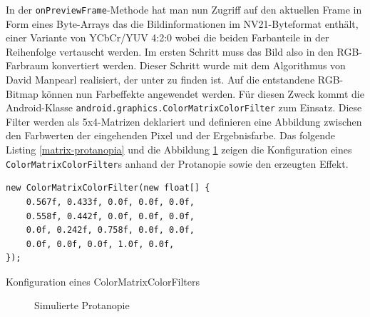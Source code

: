 \documentclass[a4paper]{article}
\begin{document}
In der \texttt{onPreviewFrame}-Methode hat man nun Zugriff auf den aktuellen Frame in Form eines Byte-Arrays das die Bildinformationen im NV21-Byteformat enthält, einer Variante von YCbCr/YUV 4:2:0 wobei die beiden Farbanteile in der Reihenfolge vertauscht werden. Im ersten Schritt muss das Bild also in den RGB-Farbraum konvertiert werden. Dieser Schritt wurde mit dem Algorithmus von David Manpearl realisiert, der unter \cite{ANDROID-YUV} zu finden ist. Auf die entstandene RGB-Bitmap können nun Farbeffekte angewendet werden. Für diesen Zweck kommt die Android-Klasse \texttt{android.graphics.ColorMatrixColorFilter} zum Einsatz. Diese Filter werden als 5x4-Matrizen deklariert und definieren eine Abbildung zwischen den Farbwerten der eingehenden Pixel und der Ergebnisfarbe. Das folgende Listing \ref{matrix-protanopia} und die Abbildung \ref{simulated-protanopia} zeigen die Konfiguration eines \texttt{ColorMatrixColorFilter}s anhand der Protanopie sowie den erzeugten Effekt.

\begin{listing}[H]
\begin{verbatim}
new ColorMatrixColorFilter(new float[] {
    0.567f, 0.433f, 0.0f, 0.0f, 0.0f,
    0.558f, 0.442f, 0.0f, 0.0f, 0.0f,
    0.0f, 0.242f, 0.758f, 0.0f, 0.0f,
    0.0f, 0.0f, 0.0f, 1.0f, 0.0f,
});
\end{verbatim}
\caption{Konfiguration eines ColorMatrixColorFilters}
\label{matrix-protanopia}
\end{listing}

\begin{figure}[H]
\centering
{}
\caption{Simulierte Protanopie}
\label{simulated-protanopia}
\end{figure}
\end{document}
